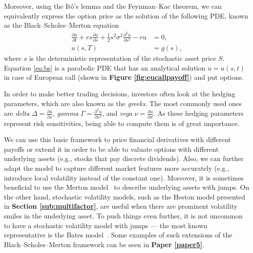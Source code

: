 \documentclass{UUThesisTemplate}
\begin{document}
\par
Moreover, using the It\^o's lemma and the Feynman--Kac theorem, we can equivalently express the option price as the solution of the following PDE, known as the Black--Scholes--Merton equation
\begin{align}
\frac{\partial u}{\partial t} + r s \frac{\partial u} {\partial s} + \frac{1}{2} s^2 \sigma^2 \frac{\partial^2 u}{\partial s^2} - r u &= 0, \nonumber \\
u(s,T) &= g(s), \label{eq:bs}
\end{align}
where $s$ is the deterministic representation of the stochastic asset price $S$. Equation \eqref{eq:bs} is a parabolic PDE that has an analytical solution $u=u(s,t)$ in case of European call (shown in \textbf{Figure \ref{fig:eucallpayoff}}) and put options. %

\par
In order to make better trading decisions, investors often look at the hedging parameters, which are also known as the \emph{greeks}. The most commonly used ones are \emph{delta} $\Delta = \frac{\partial u}{\partial s}$, \emph{gamma} $\Gamma = \frac{\partial^2 u}{\partial s^2}$, and \emph{vega} $\nu = \frac{\partial u}{\partial \sigma}$. As these hedging parameters represent risk sensitivities, being able to compute them is of great importance.

\par
We can use this basic framework to price financial derivatives with different payoffs or extend it in order to be able to valuate options with different underlying assets (e.g., stocks that pay discrete dividends). Also, we can further adapt the model to capture different market features more accurately (e.g., introduce local volatility instead of the constant one). Moreover, it is sometimes beneficial to use the Merton model~\cite{merton1976option} to describe underlying assets with jumps. On the other hand, stochastic volatility models, such as the Heston model presented in \textbf{Section \ref{sub:multifactor}}, are useful when there are prominent volatility smiles in the underlying asset. To push things even further, it is not uncommon to have a stochastic volatility model with jumps --- the most known representative is the Bates model~\cite{bates1996jumps}. Some examples of such extensions of the Black--Scholes--Merton framework can be seen in \textbf{Paper \ref{paper5}}.
\end{document}
